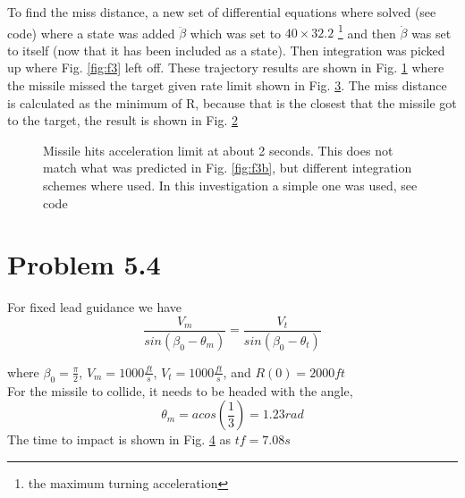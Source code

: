 \documentclass[paper=a4, fontsize=11pt]{scrartcl}
\numberwithin{equation}{section}		%
\numberwithin{figure}{section}			%
\numberwithin{table}{section}				%
\begin{document}
To find the miss distance, a new set of differential equations where solved (see code) where a state was added $\ddot{\beta}$ which was set to $40\times32.2$ \footnote{the maximum turning acceleration} and then $\dot{\beta}$ was set to itself (now that it has been included as a state). Then integration was picked up where Fig. \ref{fig:f3} left off.   These trajectory results are shown in Fig. \ref{fig:f3c} where the missile missed the target given rate limit shown in Fig. \ref{fig:f3e}. The miss distance is calculated as the minimum of R, because that is the closest that the missile got to the target, the result is shown in Fig. \ref{fig:f3d} 
\begin{figure}[!htb]
	\centering
    
	\caption{ \label{fig:f3c}}
\end{figure}

\begin{figure}[!htb]
	\centering
    
	\caption{ \label{fig:f3d}}
\end{figure}

\begin{figure}[!htb]
	\centering
    
	\caption{ Missile hits acceleration limit at about 2 seconds. This does not match what was predicted in Fig. \ref{fig:f3b}, but different integration schemes where used. In this investigation a simple one was used, see code\label{fig:f3e}}
\end{figure}

\section*{Problem 5.4}
%
For fixed lead guidance we have
$$\frac{V_m}{sin(\beta_0-\theta_m)}=\frac{V_t}{sin(\beta_0-\theta_t)}$$

where $\beta_0=\frac{\pi}{2}$, $V_m=1000 \frac{ft}{s}$, $V_t=1000 \frac{ft}{s}$, and $R(0)=2000ft$ \\

For the missile to collide, it needs to be headed with the angle, $$ \theta_m = acos(\frac{1}{3}) = 1.23 rad$$ The time to impact is shown in Fig. \ref{fig:f4} as $tf =7.08 s$
\begin{figure}[!htb]
	\centering
    
	\caption{ \label{fig:f4}}
\end{figure}


\end{document}

